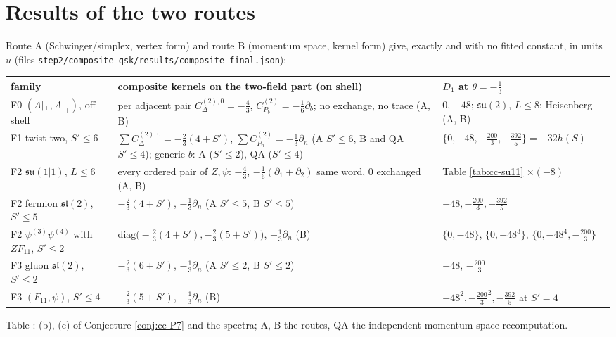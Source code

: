 \documentclass[11pt]{article}
\numberwithin{equation}{section}
\theoremstyle{plain}
\theoremstyle{definition}
\newcommand{\Ap}{A|_{\perp}}
\begin{document}
\section{Results of the two routes}
\label{sec:cc-results}

Route A (Schwinger/simplex, vertex form) and route B (momentum space, kernel form) give, exactly and with no fitted constant, in units $u$ (files \texttt{step2/composite\_qsk/results/composite\_final.json}):

\begin{center}\small
\begin{tabular}{p{4.2cm}|p{6.6cm}|p{4.6cm}}
family & composite kernels on the two-field part (on shell) & $D_1$ at $\theta=-\tfrac13$\\\hline
F0 $(\Ap,\Ap)$, off shell & per adjacent pair $C^{(2),0}_\Delta=-\tfrac43$, $C^{(2)}_{P_b}=-\tfrac16\partial_b$; no exchange, no trace (A, B) & $0$, $-48$; $\mathfrak{su}(2)$, $L\le8$: Heisenberg (A, B)\\
F1 twist two, $S'\le6$ & $\sum C^{(2),0}_\Delta=-\tfrac23(4+S')$, $\sum C^{(2)}_{P_n}=-\tfrac13\partial_n$ (A $S'\le6$, B and QA $S'\le4$); generic $b$: A ($S'\le2$), QA ($S'\le4$) & $\{0,-48,-\tfrac{200}3,-\tfrac{392}5\}=-32h(S)$\\
F2 $\mathfrak{su}(1|1)$, $L\le6$ & every ordered pair of $Z,\psi$: $-\tfrac43$, $-\tfrac16(\partial_1+\partial_2)$ same word, $0$ exchanged (A, B) & Table \ref{tab:cc-su11} $\times(-8)$\\
F2 fermion $\mathfrak{sl}(2)$, $S'\le5$ & $-\tfrac23(4+S')$, $-\tfrac13\partial_n$ (A $S'\le5$, B $S'\le5$) & $-48,-\tfrac{200}3,-\tfrac{392}5$\\
F2 $\psi^{(3)}\psi^{(4)}$ with $ZF_{11}$, $S'\le2$ & $\mathrm{diag}\big(-\tfrac23(4+S'),-\tfrac23(5+S')\big)$, $-\tfrac13\partial_n$ (B) & $\{0,-48\}$, $\{0,-48^3\}$, $\{0,-48^4,-\tfrac{200}3\}$\\
F3 gluon $\mathfrak{sl}(2)$, $S'\le2$ & $-\tfrac23(6+S')$, $-\tfrac13\partial_n$ (A $S'\le2$, B $S'\le2$) & $-48$, $-\tfrac{200}3$\\
F3 $(F_{11},\psi)$, $S'\le4$ & $-\tfrac23(5+S')$, $-\tfrac13\partial_n$ (B) & $-48^2,-\tfrac{200}3^2,-\tfrac{392}5$ at $S'=4$\\
\end{tabular}
\end{center}
\begin{center}\small Table \theequation\label{tab:cc-results}: (b), (c) of Conjecture \ref{conj:cc-P7} and the spectra; A, B the routes, QA the independent momentum-space recomputation.\end{center}
\end{document}
